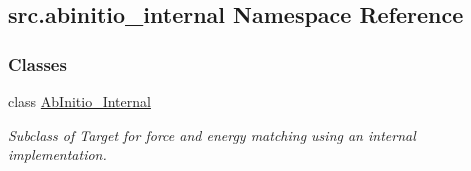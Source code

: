 \hypertarget{namespacesrc_1_1abinitio__internal}{}\subsection{src.\+abinitio\+\_\+internal Namespace Reference}
\label{namespacesrc_1_1abinitio__internal}
\subsubsection*{Classes}
\begin{DoxyCompactItemize}
\item 
class \hyperlink{classsrc_1_1abinitio__internal_1_1AbInitio__Internal}{Ab\+Initio\+\_\+\+Internal}
\begin{DoxyCompactList}\small\item\em Subclass of Target for force and energy matching using an internal implementation. \end{DoxyCompactList}\end{DoxyCompactItemize}
